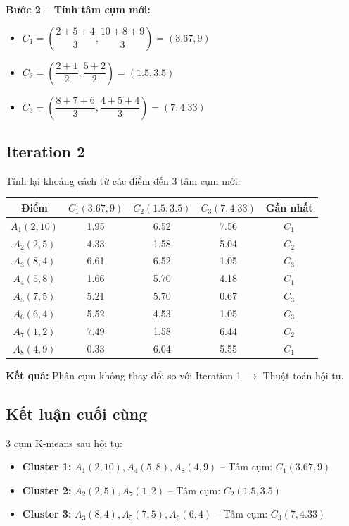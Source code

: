 \textbf{Bước 2 -- Tính tâm cụm mới:}
\begin{itemize}
    \item $C_1 = \left(\dfrac{2+5+4}{3}, \dfrac{10+8+9}{3}\right) = (3.67, 9)$
    \item $C_2 = \left(\dfrac{2+1}{2}, \dfrac{5+2}{2}\right) = (1.5, 3.5)$
    \item $C_3 = \left(\dfrac{8+7+6}{3}, \dfrac{4+5+4}{3}\right) = (7, 4.33)$
\end{itemize}

\subsection*{Iteration 2}
Tính lại khoảng cách từ các điểm đến 3 tâm cụm mới:
\begin{table}[H]
    \centering
    \begin{tabular}{|c|c|c|c|c|}
        \hline
        \textbf{Điểm} & \textbf{$C_1(3.67, 9)$} & \textbf{$C_2(1.5, 3.5)$} & \textbf{$C_3(7, 4.33)$} & \textbf{Gần nhất} \\
        \hline
        $A_1(2,10)$ & 1.95 & 6.52 & 7.56 & $C_1$ \\ \hline
        $A_2(2,5)$ & 4.33 & 1.58 & 5.04 & $C_2$ \\ \hline
        $A_3(8,4)$ & 6.61 & 6.52 & 1.05 & $C_3$ \\ \hline
        $A_4(5,8)$ & 1.66 & 5.70 & 4.18 & $C_1$ \\ \hline
        $A_5(7,5)$ & 5.21 & 5.70 & 0.67 & $C_3$ \\ \hline
        $A_6(6,4)$ & 5.52 & 4.53 & 1.05 & $C_3$ \\ \hline
        $A_7(1,2)$ & 7.49 & 1.58 & 6.44 & $C_2$ \\ \hline
        $A_8(4,9)$ & 0.33 & 6.04 & 5.55 & $C_1$ \\ \hline
    \end{tabular}
\end{table}

\textbf{Kết quả:} Phân cụm không thay đổi so với Iteration 1 $\rightarrow$ Thuật toán hội tụ.

\subsection*{Kết luận cuối cùng}
3 cụm K-means sau hội tụ:
\begin{itemize}
    \item \textbf{Cluster 1:} $A_1(2,10), A_4(5,8), A_8(4,9)$ -- Tâm cụm: $C_1(3.67, 9)$
    \item \textbf{Cluster 2:} $A_2(2,5), A_7(1,2)$ -- Tâm cụm: $C_2(1.5, 3.5)$
    \item \textbf{Cluster 3:} $A_3(8,4), A_5(7,5), A_6(6,4)$ -- Tâm cụm: $C_3(7, 4.33)$
\end{itemize}